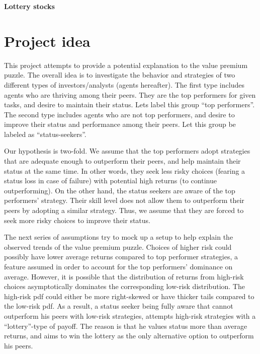 \documentclass[12pt]{article}
\numberwithin{equation}{section}
\begin{document}
\onehalfspacing

\begin{center}
\huge\textbf{Lottery stocks}
\end{center}

\section{Project idea}

\indent\par This project attempts to provide a potential explanation
to the value premium puzzle. The overall idea is to investigate the
behavior and strategies of two different types of investors/analysts
(agents hereafter). The first type includes agents who are thriving
among their peers. They are the top performers for given tasks, and
desire to maintain their status. Lets label this group ``top
performers''. The second type includes agents who are not top
performers, and desire to improve their status and performance among
their peers. Let this group be labeled as ``status-seekers''.

Our hypothesis is two-fold. We assume that the top performers adopt
strategies that are adequate enough to outperform their peers, and
help maintain their status at the same time. In other words, they
seek less risky choices (fearing a status loss in case of failure)
with potential high returns (to continue outperforming). On the
other hand, the status seekers are aware of the top performers'
strategy. Their skill level does not allow them to outperform their
peers by adopting a similar strategy. Thus, we assume that they are
forced to seek more risky choices to improve their status.

The next series of assumptions try to mock up a setup to help
explain the observed trends of the value premium puzzle. Choices of
higher risk could possibly have lower average returns compared to
top performer strategies, a feature assumed in order to account for
the top performers' dominance on average. However, it is possible
that the distribution of returns from high-risk choices
asymptotically dominates the corresponding low-risk distribution.
The high-risk pdf could either be more right-skewed or have thicker
tails compared to the low-risk pdf. As a result, a status seeker
being fully aware that cannot outperform his peers with low-risk
strategies, attempts high-risk strategies with a ``lottery''-type of
payoff. The reason is that he values status more than average
returns, and aims to win the lottery as the only alternative option
to outperform his peers.
\end{document}
